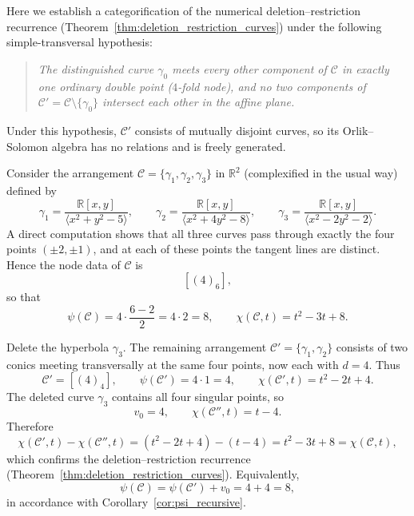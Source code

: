 \documentclass[article,11pt]{amsart} \numberwithin{equation}{section}
\numberwithin{equation}{section}
\begin{document}
{Here we establish a categorification of the numerical
deletion–restriction recurrence (Theorem~\ref{thm:deletion_restriction_curves})
under the following simple-transversal hypothesis:

\begin{quote}
	\emph{The distinguished curve $\gamma_0$ meets every other component of $\mathcal C$ in exactly one ordinary double point ($4$-fold node), and no two components of $\mathcal C' = \mathcal C \setminus \{\gamma_0\}$ intersect each other in the affine plane.}
\end{quote}

Under this hypothesis, $\mathcal C'$ consists of mutually disjoint curves,
so its Orlik–Solomon algebra has no relations and is freely generated.

\begin{ex}
	\label{ex:dr_verification}
	Consider the arrangement $\mathcal C = \{\gamma_1,\gamma_2,\gamma_3\}$ in $\mathbb{R}^2$ (complexified in the usual way) defined by
	\[
	\gamma_1 = \frac{\mathbb{R}[x,y]}{\langle x^2 + y^2 - 5 \rangle},\qquad
	\gamma_2 = \frac{\mathbb{R}[x,y]}{\langle x^2 + 4y^2 - 8 \rangle},\qquad
	\gamma_3 = \frac{\mathbb{R}[x,y]}{\langle x^2 - 2y^2 - 2 \rangle}.
	\]
	A direct computation shows that all three curves pass through exactly the four points $(\pm 2,\pm 1)$, and at each of these points the tangent lines are distinct. Hence the node data of $\mathcal C$ is
	\[
	[(4)_6],
	\]
	so that
	\[
	\psi(\mathcal C) = 4\cdot \frac{6-2}{2} = 4\cdot 2 = 8,
	\qquad
	\chi(\mathcal C,t) = t^2 - 3t + 8.
	\]
	
	Delete the hyperbola $\gamma_3$. The remaining arrangement $\mathcal C' = \{\gamma_1,\gamma_2\}$ consists of two conics meeting transversally at the same four points, now each with $d=4$. Thus
	\[
	\mathcal C' = [(4)_4],
	\qquad
	\psi(\mathcal C') = 4\cdot 1 = 4,
	\qquad
	\chi(\mathcal C',t) = t^2 - 2t + 4.
	\]
	The deleted curve $\gamma_3$ contains all four singular points, so
	\[
	v_0 = 4,
	\qquad
	\chi(\mathcal C'',t) = t - 4.
	\]
	Therefore
	\[
	\chi(\mathcal C',t) - \chi(\mathcal C'',t)
	= (t^2 - 2t + 4) - (t - 4)
	= t^2 - 3t + 8
	= \chi(\mathcal C,t),
	\]
	which confirms the deletion–restriction recurrence (Theorem~\ref{thm:deletion_restriction_curves}). Equivalently,
	\[
	\psi(\mathcal C) = \psi(\mathcal C') + v_0 = 4 + 4 = 8,
	\]
	in accordance with Corollary~\ref{cor:psi_recursive}.
\end{ex}

}
\end{document}
